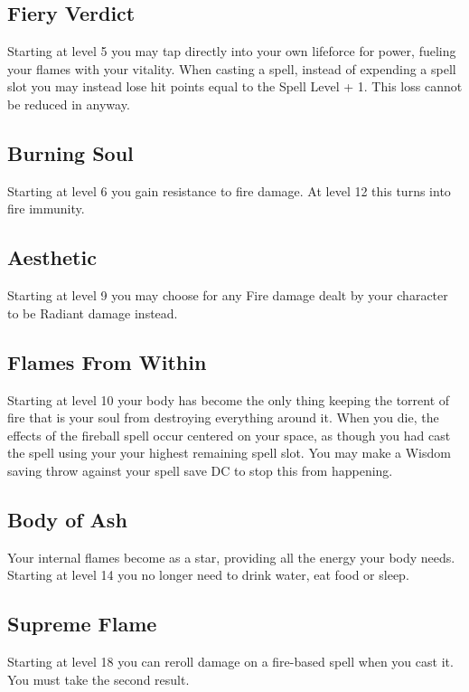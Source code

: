 \subsection{Fiery Verdict}

Starting at level 5 you may tap directly into your own lifeforce for power, fueling your flames with your vitality. When casting a spell, instead of expending a spell slot you may instead lose hit points equal to the Spell Level + 1. This loss cannot be reduced in anyway.

\subsection{Burning Soul}

Starting at level 6 you gain resistance to fire damage. At level 12 this turns into fire immunity.

\subsection{Aesthetic}

Starting at level 9 you may choose for any Fire damage dealt by your character to be Radiant damage instead.

\subsection{Flames From Within}

Starting at level 10 your body has become the only thing keeping the torrent of fire that is your soul from destroying everything around it. When you die, the effects of the fireball spell occur centered on your space, as though you had cast the spell using your your highest remaining spell slot. You may make a Wisdom saving throw against your spell save DC to stop this from happening.

\subsection{Body of Ash}

Your internal flames become as a star, providing all the energy your body needs. Starting at level 14 you no longer need to drink water, eat food or sleep.

\subsection{Supreme Flame}

Starting at level 18 you can reroll damage on a fire-based spell when you cast it. You must take the second result.

